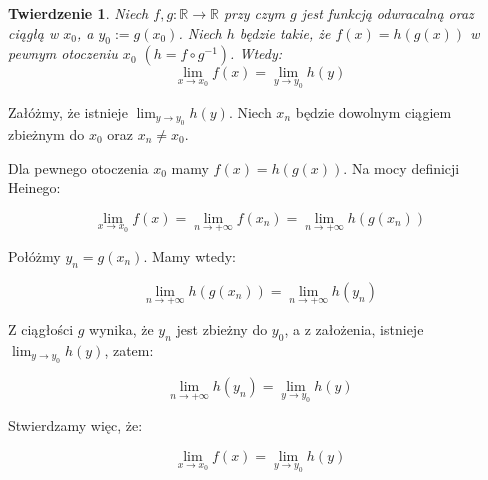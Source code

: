 \documentclass{article}
\newtheorem*{theorem}{Twierdzenie}
\begin{document}
\begin{theorem}
    Niech \(f, g : \mathbb{R} \to \mathbb{R}\) przy czym \(g\) jest funkcją odwracalną oraz ciągłą w \(x_0\), a \(y_0 := g(x_0)\).
    Niech \(h\) będzie takie, że \(f(x) = h(g(x))\) w pewnym otoczeniu \(x_0\) \((h = f \circ g^{-1})\).
    Wtedy:
    \begin{equation*}
        \lim_{x \to x_0} f(x) = \lim_{y \to y_0} h(y)
    \end{equation*}
\end{theorem}



Załóżmy, że istnieje \(\lim_{y \to y_0} h(y)\). Niech \(x_n\) będzie dowolnym ciągiem zbieżnym do \(x_0\) oraz \(x_n \neq x_0\).

Dla pewnego otoczenia \(x_0\) mamy \(f(x) = h(g(x))\). Na mocy definicji Heinego:

\begin{equation*}
    \lim_{x \to x_0} f(x) = \lim_{n \to + \infty} f(x_n) = \lim_{n \to + \infty} h(g(x_n))
\end{equation*}

Połóżmy \(y_n = g(x_n)\). Mamy wtedy:

\begin{equation*}
    \lim_{n \to + \infty} h(g(x_n)) = \lim_{n \to + \infty} h(y_n)
\end{equation*}

Z ciągłości \(g\) wynika, że \(y_n\) jest zbieżny do \(y_0\), a z założenia, istnieje \(\lim_{y \to y_0} h(y)\), zatem: 

\begin{equation*}
    \lim_{n \to + \infty} h(y_n) = \lim_{y \to y_0} h(y)
\end{equation*}

Stwierdzamy więc, że:

\begin{equation*}
    \lim_{x \to x_0} f(x) = \lim_{y \to y_0} h(y)
\end{equation*}
\end{document}
